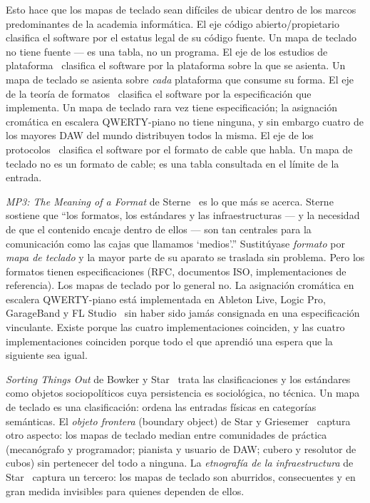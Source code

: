 \documentclass[10pt,letterpaper,twocolumn]{article}
\begin{document}
Esto hace que los mapas de teclado sean difíciles de ubicar dentro de los marcos predominantes de la academia informática. El eje código abierto/propietario~\citep{galloway2004protocol} clasifica el software por el estatus legal de su código fuente. Un mapa de teclado no tiene fuente --- es una tabla, no un programa. El eje de los estudios de plataforma~\citep{nieborg2018platformization} clasifica el software por la plataforma sobre la que se asienta. Un mapa de teclado se asienta sobre \emph{cada} plataforma que consume su forma. El eje de la teoría de formatos~\citep{sterne2012mp3} clasifica el software por la especificación que implementa. Un mapa de teclado rara vez tiene especificación; la asignación cromática en escalera QWERTY-piano no tiene ninguna, y sin embargo cuatro de los mayores DAW del mundo distribuyen todos la misma. El eje de los protocolos~\citep{galloway2004protocol} clasifica el software por el formato de cable que habla. Un mapa de teclado no es un formato de cable; es una tabla consultada en el límite de la entrada.

\emph{MP3: The Meaning of a Format} de Sterne~\citep{sterne2012mp3} es lo que más se acerca. Sterne sostiene que ``los formatos, los estándares y las infraestructuras --- y la necesidad de que el contenido encaje dentro de ellos --- son tan centrales para la comunicación como las cajas que llamamos `medios'.'' Sustitúyase \emph{formato} por \emph{mapa de teclado} y la mayor parte de su aparato se traslada sin problema. Pero los formatos tienen especificaciones (RFC, documentos ISO, implementaciones de referencia). Los mapas de teclado por lo general no. La asignación cromática en escalera QWERTY-piano está implementada en Ableton Live, Logic Pro, GarageBand y FL Studio~\citep{ableton_musical_typing,apple_logic_musicaltyping,imageline_typing_piano} sin haber sido jamás consignada en una especificación vinculante. Existe porque las cuatro implementaciones coinciden, y las cuatro implementaciones coinciden porque todo el que aprendió una espera que la siguiente sea igual.

\emph{Sorting Things Out} de Bowker y Star~\citep{bowker1999sorting} trata las clasificaciones y los estándares como objetos sociopolíticos cuya persistencia es sociológica, no técnica. Un mapa de teclado es una clasificación: ordena las entradas físicas en categorías semánticas. El \emph{objeto frontera} (boundary object) de Star y Griesemer~\citep{star1989boundary} captura otro aspecto: los mapas de teclado median entre comunidades de práctica (mecanógrafo y programador; pianista y usuario de DAW; cubero y resolutor de cubos) sin pertenecer del todo a ninguna. La \emph{etnografía de la infraestructura} de Star~\citep{star1999ethnography} captura un tercero: los mapas de teclado son aburridos, consecuentes y en gran medida invisibles para quienes dependen de ellos.
\end{document}
